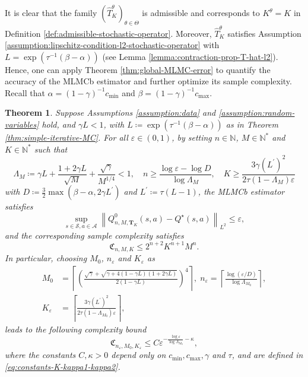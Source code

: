 \documentclass[11pt]{article}
\numberwithin{equation}{section}
\newtheorem{theorem}{Theorem}[section]
\theoremstyle{definition}
\theoremstyle{remark}
\def\N{{\mathbb{N}}}
\begin{document}
It is clear that the family $ (\hat T^\theta_K)_{\theta \in \Theta}$ is admissible and corresponds to $K^\theta=K$  in Definition \ref{def:admissible-stochastic-operator}.
Moreover,  $\hat T^\theta_K$  satisfies Assumption \ref{assumption:lipschitz-condition-l2-stochastic-operator} 
with 
$L = \exp \left( \tau^{-1}(\beta - \alpha) \right)$
(see  Lemma \ref{lemma:contraction-prop-T-hat-l2}). Hence, one can apply Theorem \ref{thm:global-MLMC-error} to quantify the accuracy of the MLMCb estimator and further optimize its sample complexity.
Recall 
  that $\alpha =  (1 - \gamma)^{-1}c_{\min}$ and $ \beta =   (1 - \gamma)^{-1}c_{\max}$.
\begin{theorem}
    \label{theorem:error-complexity-MC}
    Suppose  Assumptions \ref{assumption:data} and  \ref{assumption:random-variables} hold, and  
$\gamma L<1$,
with
$L \coloneqq \exp \left( \tau^{-1} (\beta - \alpha)\right)$ 
as in Theorem  \ref{thm:simple-iterative-MC}.
  For all $\varepsilon\in (0,1)$, by setting $n\in \N$, $M\in \N^*$
    and $K\in \N^*$ such that 
 \begin{equation}
        \label{eq:conditions-M-n-MC}
         \Lambda_M \coloneqq \gamma L + \frac{1 + 2 \gamma L}{\sqrt{M}} + \frac{\sqrt{\gamma}}{M^{1/4}} < 1, \quad n \geq \frac{\log \varepsilon - \log D}{\log \Lambda_M}, \quad K \geq \frac{3\gamma (L^\prime)^2 }{2 \tau (1 - \Lambda_{M})\varepsilon} 
    \end{equation}
    with 
    $  
        D \coloneqq \frac{3}{2} \max \left( \beta - \alpha, 2 \gamma L^\prime \right)
    $ and 
    $  L^\prime \coloneqq  \tau (L - 1)$,
      the MLMCb estimator satisfies   
    $$     \sup_{s \in \mathcal S, a \in \mathcal A} \left\| Q^0_{n, M,  \mathbf{T}_K}(s,a) - Q^{\star}(s,a) \right\|_{L^2} \leq \varepsilon, 
    $$ 
    and the corresponding sample complexity satisfies  
    \begin{equation}
        \label{eq:sample-complexity-bound-MC}
	\mathfrak C_{n,M, K} \leq  2^{n+2} K^{n+1}M^{n}.
    \end{equation}
 In particular, choosing 
 $M_0 $,  $n_\varepsilon$ and $K_\varepsilon$ as 
 \[
 \begin{aligned}
  M_0 &= \left\lceil \left(\frac{\sqrt{\gamma} + \sqrt{\gamma + 4(1 - \gamma L)(1 + 2\gamma L)}}{2(1- \gamma L)} \right)^4 \right\rceil, \; 
 n_\varepsilon  = \left\lceil  \frac{\log (\varepsilon /D)}{\log \Lambda_{M_0}}\right\rceil,   \\
        K_\varepsilon &= \left\lceil    \frac{3    \gamma (L^\prime)^2}{2 \tau(1 -\Lambda_{M_0})\varepsilon}  \right\rceil,
\end{aligned}
 \]
 leads to the following complexity bound
    \begin{equation}
        \label{eq:sample-complexity-quasi-polynomial-MC}
 \mathfrak C_{n_\varepsilon,M_0, K_\varepsilon}  \leq C   \varepsilon^{ -\frac{\log \varepsilon}{ \log \Lambda_{M_0}}   - \kappa},
    \end{equation}
    where the constants  $C, \kappa>0$   depend only on $c_{\min}, c_{\max}, \gamma$ and $ \tau$, and are defined in \eqref{eq:constants-K-kappa1-kappa2}.
\end{theorem}
\end{document}
